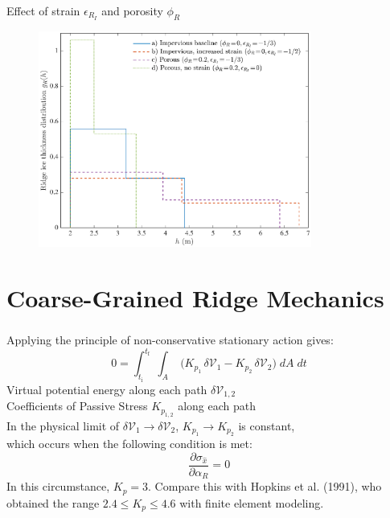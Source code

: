 \documentclass[aspectratio=169,11pt]{beamer}
\begin{document}
\begin{frame}
\frametitle{\insertsection}
\centering
Effect of strain $\epsilon_{R_I}$ and porosity $\phi_{R}$
\begin{figure}[ht]
\noindent\centerline{\includegraphics[width=0.8\textwidth,height=\textheight,keepaspectratio]{Figures/Thickness_DistR.eps}}
\end{figure}
\end{frame}



\section{Coarse-Grained Ridge Mechanics}


\begin{frame}
\frametitle{\insertsection}
\centering
Applying the principle of non-conservative stationary action gives:
\begin{equation*}
0={\int_{t_{\textrm{i}}}^{t_{\textrm{f}}}}\;\int_{A}\;
	\bigg( {K_{p_1}}\,\delta\mathcal{V}_1
  - {K_{p_2}}\,\delta\mathcal{V}_2 \bigg)
  	\;dA\;dt 
\end{equation*}
Virtual potential energy along each path $\delta\mathcal{V}_{1,2}$ \\
Coefficients of Passive Stress ${K_{p_{1,2}}}$ along each path \\
\vspace{5mm}
In the physical limit of $\delta\mathcal{V}_{1}\to\delta\mathcal{V}_{2}$, ${K_{p_1}}\to{K_{p_2}}$ is constant, \\
which occurs when the following condition is met:
\begin{equation*}
\frac{\partial\sigma_{\hat{x}}}{\partial\alpha_R}=0
\end{equation*}
In this circumstance, ${K_{p}}=3$. Compare this with Hopkins et al. (1991), who obtained the range  $2.4\leq{K_{p}}\leq4.6$ with finite element modeling.

\end{frame}
\end{document}
